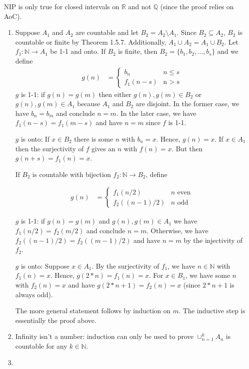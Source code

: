 \documentclass[a4paper]{report}
\newenvironment{ex}[1]
    {\noindent{\large \bf Exercise #1.}}{\newline}
\begin{document}
\begin{ex}{1.5.2}
NIP is only true for closed intervals on $\mathbb{R}$ and not $\mathbb{Q}$
(since the proof relies on AoC).
\end{ex}

\begin{ex}{1.5.3}
  \begin{enumerate}[label=\alph*)]
  \item Suppose $A_1$ and $A_2$ are countable and let $B_2 = A_2 \setminus A_1$.
    Since $B_2 \subseteq A_2$, $B_2$ is countable or finite by Theorem 1.5.7.
    Additionally, $A_1 \cup A_2 = A_1 \cup B_2$. Let $f_1 : \mathbb{N}
    \rightarrow A_1$ be 1-1 and onto. If $B_2$ is finite, then $B_2 = \{b_1, b_2,
    \dots, b_s\}$ and we define
    \begin{align*}
      g(n) &= \begin{cases}
        b_n & \text{$n \leq s$} \\
        f_1(n - s) & \text{n > s}
              \end{cases}
    \end{align*}
   $g$ is 1-1: if $g(n) = g(m)$ then either $g(n), g(m) \in B_2$ or $g(n), g(m) \in A_1$
   because $A_1$ and $B_2$ are disjoint. In the former case, we have $b_n = b_m$
   and conclude $n = m$. In the later case, we have $f_1(n - s) = f_1 (m - s)$
   and have $n = m$ since $f$ is 1-1.

   $g$ is onto: If $x \in B_2$ there is some $n$ with $b_n = x$. Hence, $g(n) =
   x$. If $x \in A_1$ then the surjectivity of $f$ gives an $n$ with $f(n) = x$.
   But then $g(n + s) = f_1(n) = x$.

   If $B_2$ is countable with bijection $f_2: \mathbb{N} \rightarrow B_2$, define
   
   \begin{align*}
     g(n) &= \begin{cases}
       f_1(n/2) & \text{$n$ even} \\
       f_2((n - 1)/2) & \text{$n$ odd}
     \end{cases}
   \end{align*}

   $g$ is 1-1: if $g(n) = g(m)$ and $g(n),g(m) \in A_1$ we have $f_1(n/2) = f_2(m/2)$
   and conclude $n = m$. Otherwise, we have $f_2((n - 1)/2) = f_2((m - 1)/2)$
   and have $n = m$ by the injectivity of $f_2$.

   $g$ is onto: Suppose $x \in A_1$. By the surjectivity of $f_1$, we have $n
   \in \mathbb{N}$ with $f_1(n) = x$. Hence, $g(2*n) = f_1(n) = x$. For $x \in
   B_1$, we have some $n$ with $f_2(n) = x$ and have $g(2*n + 1) = f_2(n) = x$
   (since $2*n + 1$ is always odd).

   The more general statement follows by induction on $m$. The inductive step is
   essentially the proof above.
  \item Infinity isn't a number: induction can only be used to prove $\cup_{n=1}^k
    A_n$ is countable for any $k \in \mathbb{N}$.
  \item 
  \end{enumerate}
\end{ex}
\end{document}
